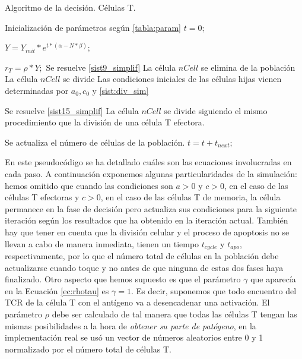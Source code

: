 \begin{algorithm}
	\caption{Algoritmo de la decisión. Células T.}
	\label{algo:pseudocodigo}
	\begin{algorithmic}[1]
		
		
		\State Inicialización de parámetros según \ref{tabla:param}
		\State $t = 0;$ 
		
		  
		\State $Y = Y_{init}*e^{t*(\alpha - N*\beta)};$ 
		
		 
			\State $ r_{T}=\rho*Y;$ 
			 
				\State Se resuelve \ref{sist9_simplif}
					\State La célula $nCell$ se elimina de la población
					\State La célula $nCell$ se divide
					\State Las condiciones iniciales de las células hijas vienen determinadas por $a_0, c_0$ y \ref{sist:div_sim}
				\EndIf
			
			 
				\State Se resuelve \ref{sist15_simplif}
					\State La célula $nCell$ se divide siguiendo el mismo procedimiento que la división de una célula T efectora. 
				\EndIf
			\EndIf
		\EndFor
		
		\State Se actualiza el número de células de la población.
		\State $t = t + t_{next};$
		
		\EndWhile
		
	\end{algorithmic}
\end{algorithm}

En este pseudocódigo se ha detallado cuáles son las ecuaciones involucradas en cada paso. A continuación exponemos algunas particularidades de la simulación: hemos omitido que cuando las condiciones son $a > 0$ y $c > 0$, en el caso de las células T efectoras y $c > 0$, en el caso de las células T de memoria, la célula permanece en la fase de decisión pero actualiza sus condiciones para la siguiente iteración según los resultados que ha obtenido en la iteración actual. También hay que tener en cuenta que la división celular y el proceso de apoptosis no se llevan a cabo de manera inmediata, tienen un tiempo $t_{cycle}$ y $t_{apo}$, respectivamente, por lo que el número total de células en la población debe actualizarse cuando toque y no antes de que ninguna de estas dos fases haya finalizado. Otro aspecto que hemos supuesto es que el parámetro $\gamma$ que aparecía en la Ecuación \ref{ec:rhotau} es $\gamma = 1$. Es decir, suponemos que todo encuentro del TCR de la célula T con el antígeno va a desencadenar una activación. El parámetro $\rho$ debe ser calculado de tal manera que todas las células T tengan las mismas posibilidades a la hora de \textit{obtener su parte de patógeno}, en la implementación real se usó un vector de números aleatorios entre 0 y 1 normalizado por el número total de células T.

